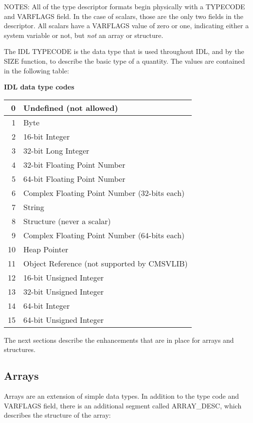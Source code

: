 \documentclass[12pt]{article}
\begin{document}
NOTES: All of the type descriptor formats begin physically with a
TYPECODE and VARFLAGS field.  In the case of scalars, those are the
only two fields in the descriptor.  All scalars have a VARFLAGS value
of zero or one, indicating either a system variable or not, but {\it
not \/} an array or structure.

The IDL TYPECODE is the data type that is used throughout IDL, and by
the SIZE function, to describe the basic type of a quantity.  The
values are contained in the following table:

\begin{center}
\centerline{\bf IDL data type codes}
\begin{tabular}{|r|l|}
\hline
 0 & Undefined (not allowed)\\\hline
 1 & Byte \\\hline
 2 & 16-bit Integer \\\hline
 3 & 32-bit Long Integer \\\hline
 4 & 32-bit Floating Point Number \\\hline
 5 & 64-bit Floating Point Number \\\hline
 6 & Complex Floating Point Number (32-bits each) \\\hline
 7 & String \\\hline
 8 & Structure (never a scalar) \\\hline
 9 & Complex Floating Point Number (64-bits each) \\\hline
10 & Heap Pointer \\\hline
11 & Object Reference (not supported by CMSVLIB) \\\hline
12 & 16-bit Unsigned Integer \\\hline
13 & 32-bit Unsigned Integer \\\hline
14 & 64-bit Integer \\\hline
15 & 64-bit Unsigned Integer \\\hline
\end{tabular}
\end{center}

The next sections describe the enhancements that are in place for
arrays and structures.

\subsection{Arrays\label{s::arrays}}

Arrays are an extension of simple data types.  In addition to the type
code and VARFLAGS field, there is an additional segment called
ARRAY\_DESC, which describes the structure of the array:
\end{document}
